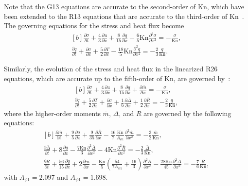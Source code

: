
Note that the G13 equations are accurate to the second-order of $\text{Kn}$, which have been extended to the R13 equations that are accurate to the third-order of $\text{Kn}$~\cite{henning}. The governing equations for the stress and heat flux become
\begin{equation}
\begin{aligned}[b]
\frac{\partial \sigma}{\partial t}+\frac{4}{3}\frac{\partial u}{\partial x}+\frac{8}{15}\frac{\partial q}{\partial x}-\frac{6}{5}\text{Kn}\frac{\partial^2\sigma}{\partial x^2}=-\frac{\sigma}{\text{Kn}},\\
\frac{\partial q}{\partial t}+\frac{\partial \sigma}{\partial x}+\frac{5}{2}\frac{\partial {T}}{\partial x}-\frac{18}{5}\text{Kn}\frac{\partial^2q}{\partial x^2}=-\frac{2}{3}\frac{q}{\text{Kn}}.
\end{aligned}
\end{equation}


Similarly, the evolution of the stress and heat flux in the linearized R26 equations, which are accurate up to the fifth-order of $\text{Kn}$, are governed by~\cite{Gu2009JFM}:
\begin{equation}
\begin{aligned}[b]
\frac{\partial \sigma}{\partial t}+\frac{4}{3}\frac{\partial u}{\partial x}+\frac{8}{15}\frac{\partial q}{\partial x}+\frac{\partial \bar{m}}{\partial x}=-\frac{\sigma}{\text{Kn}},\\
\frac{\partial q}{\partial t}+\frac{5}{2}\frac{\partial {T}}{\partial x}+\frac{\partial \sigma}{\partial x}+\frac{1}{6}\frac{\partial\bar{\Delta}}{\partial{}x}+\frac{1}{2}\frac{\partial\bar{R}}{\partial{x}}=-\frac{2}{3}\frac{q}{\text{Kn}},
\end{aligned}
\end{equation}
where the higher-order moments $\bar{m}$, $\bar{\Delta}$, and $\bar{R}$ are governed by the following equations:
\begin{equation}\label{Gu_R26}
\begin{aligned}[b]
\frac{\partial\bar{m}}{\partial{t}}+\frac{9}{5}\frac{\partial\sigma}{\partial{x}}+\frac{9}{35}\frac{\partial\bar{R}}{\partial{x}}-\frac{16}{7}\frac{\text{Kn}}{A_{\phi1}}\frac{\partial^2\bar{m}}{\partial{x}^2}=-\frac{3}{2}\frac{\bar{m}}{\text{Kn}},\\
\frac{\partial\bar{\Delta}}{\partial{t}}+8\frac{\partial{q}}{\partial{x}}-\frac{7\text{Kn}}{3}\frac{\partial^2\bar{\Delta}}{\partial{x}^2}-4\text{Kn}\frac{\partial^2\bar{R}}{\partial{x^2}}=-\frac{2}{3}\frac{\bar{\Delta}}{\text{Kn}},\\
\frac{\partial\bar{R}}{\partial{t}}+\frac{56}{15}\frac{\partial{q}}{\partial{x}}+2\frac{\partial\bar{m}}{\partial{x}}-\frac{\text{Kn}}{5}\left(\frac{54}{7A_{\psi1}}+\frac{16}{3}\right)\frac{\partial^2\bar{R}}{\partial{x}^2}-\frac{28\text{Kn}}{45}\frac{\partial^2\bar{\Delta}}{\partial{x}^2}=-\frac{7}{6}\frac{\bar{R}}{\text{Kn}},
\end{aligned}
\end{equation}
with $A_{\phi1}=2.097$ and $A_{\psi1}=1.698$.

